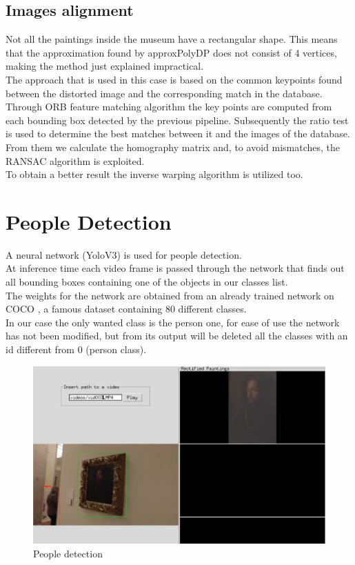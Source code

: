 \documentclass[conference]{IEEEtran}
\begin{document}
\subsection{Images alignment}
Not all the paintings inside the museum have a rectangular shape. This means that the approximation found by approxPolyDP does not consist of 4 vertices, making the method just explained impractical.\\
The approach that is used in this case is based on the common keypoints found between the distorted image and the corresponding match in the database.\\
Through ORB feature matching algorithm the key points are computed from each bounding box detected by the previous pipeline. Subsequently the ratio test is used to determine the best matches between it and the images of the database.\\
From them we calculate the homography matrix and,
to avoid mismatches, the RANSAC algorithm is exploited.\\
To obtain a better result the inverse warping algorithm is utilized too.\\

\section{People Detection}
A neural network (YoloV3) is used for people detection.\\
At inference time each video frame is passed through the network that finds out all bounding boxes containing one of the objects in our classes list.\\
The weights for the network are obtained from an already trained network on COCO \cite{b11}, a famous dataset containing 80 different classes.\\
In our case the only wanted class is the person one, for ease of use the network has not been modified, but from its output will be deleted all the classes with an id different from 0 (person class).\\

\begin{figure}[htbp]
\centerline{\includegraphics[width=0.8\columnwidth]{../people_detection/paint_and_person.png}}
\caption{People detection}
\label{fig_People_detection}
\end{figure}
\end{document}
